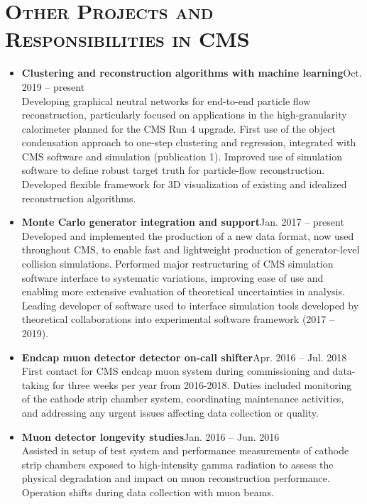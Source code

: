 \documentclass[10pt]{res} %
\begin{document}
\begin{resume}
\begin{itemize}
\end{itemize}

\section{\textsc{Other Projects and Responsibilities in CMS}}
\begin{itemize}
  \item\textbf{Clustering and reconstruction algorithms with machine learning}\hfill{Oct. 2019 -- present} \\
    Developing graphical neutral networks for end-to-end particle flow reconstruction,
    particularly focused on applications in the high-granularity calorimeter planned for the CMS Run 4 upgrade.
    First use of the object condensation approach to one-step clustering and regression,
    integrated with CMS software and simulation (publication 1).
    Improved use of simulation software to define robust target truth for particle-flow reconstruction.
    Developed flexible framework for 3D visualization of existing and idealized reconstruction algorithms.

  \item\textbf{Monte Carlo generator integration and support}\hfill{Jan. 2017 -- present} \\
    Developed and implemented the production of a new data format, now used throughout CMS, to enable fast and lightweight production
    of generator-level collision simulations. Performed major restructuring of CMS simulation software interface
    to systematic variations, improving ease of use and enabling more extensive evaluation of theoretical uncertainties in analysis.
    Leading developer of software used to interface simulation tools
    developed by theoretical collaborations into experimental software framework (2017 -- 2019).

  \item\textbf{Endcap muon detector detector on-call shifter}\hfill{Apr. 2016 -- Jul. 2018} \\
    First contact for CMS endcap muon system during commissioning and data-taking for three weeks per year
    from 2016-2018. Duties included monitoring of the cathode strip chamber system, coordinating maintenance activities,
    and addressing any urgent issues affecting data collection or quality.

  \item\textbf{Muon detector longevity studies}\hfill{Jan. 2016 -- Jun. 2016} \\
    Assisted in setup of test system and performance measurements of cathode strip chambers
    exposed to high-intensity gamma radiation to assess the physical degradation and impact on muon
    reconstruction performance. Operation shifts during data collection with muon beams.


\end{itemize}
\end{resume}
\end{document}
